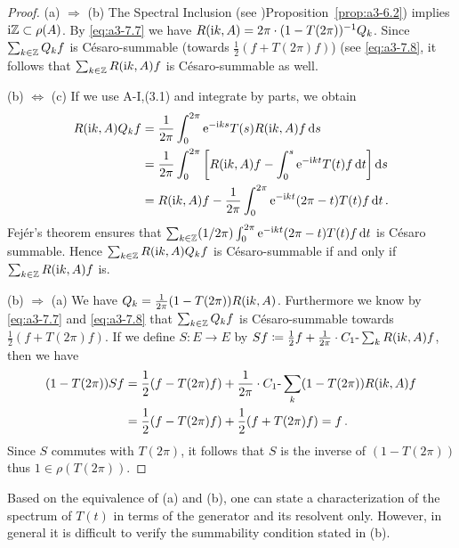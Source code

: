 \begin{proof}
(a) $\Rightarrow$ (b) The Spectral Inclusion (see )Proposition~\ref{prop:a3-6.2}) implies $\mathrm{i}\mathbb{Z} \subset \rho(A)$.
By \eqref{eq:a3-7.7} we have $R(\mathrm{i} k,A) = 2\pi\cdot(1-T(2\pi))^{-1}Q_{k}$.
Since $\sum_{k\in\mathbb{Z}} Q_{k}f$ is Césaro-summable (towards $\frac{1}{2}(f + T(2\pi)f)$) (see \eqref{eq:a3-7.8}, it follows that $\sum_{k\in\mathbb{Z}} R(\mathrm{i} k,A)f$ is Césaro-summable as well.

(b) $\Leftrightarrow$ (c) If we use A-I,(3.1) and integrate by parts, we obtain
\begin{align*}
R(\mathrm{i} k,A)Q_{k}f &= \frac{1}{2\pi}\int_{0}^{2\pi} \mathrm{e}^{-\mathrm{i} ks} T(s)R(\mathrm{i} k,A)f \mathop{}\!\mathrm{d}{s} \\
&= \frac{1}{2\pi}\int_{0}^{2\pi} \left[R(\mathrm{i} k,A)f - \int_{0}^{s} \mathrm{e}^{-\mathrm{i} kt} T(t)f \mathop{}\!\mathrm{d}{t}\right] \mathop{}\!\mathrm{d}{s} \\
&= R(\mathrm{i} k,A)f - \frac{1}{2\pi}\int_{0}^{2\pi} \mathrm{e}^{-\mathrm{i} kt} (2\pi-t) T(t)f \mathop{}\!\mathrm{d}{t}\,.
\end{align*}
Fejér's theorem ensures that $\sum_{k\in\mathbb{Z}} (1/2\pi)\int_{0}^{2\pi} \mathrm{e}^{-\mathrm{i} kt} (2\pi-t) T(t)f \mathop{}\!\mathrm{d}{t}$ is Césaro summable.
Hence $\sum_{k\in\mathbb{Z}} R(\mathrm{i} k,A)Q_{k}f$ is Césaro-summable if and only if $\sum_{k\in\mathbb{Z}} R(\mathrm{i} k,A)f$ is.

(b) $\Rightarrow$ (a) We have $Q_{k} = \frac{1}{2\pi}(1 - T(2\pi))R(\mathrm{i} k,A)$.
Furthermore we know by \eqref{eq:a3-7.7} and \eqref{eq:a3-7.8} that $\sum_{k\in\mathbb{Z}} Q_{k}f$ is Césaro-summable towards $\frac{1}{2}(f + T(2\pi)f)$.
If we define $S \colon E \to E$ by $Sf \coloneqq \frac{1}{2}f + \frac{1}{2\pi}\cdot C_{1}\text{-}\sum_k R(\mathrm{i} k,A)f$, then we have
\begin{align*}
(1 - T(2\pi))Sf &= \frac{1}{2}(f - T(2\pi)f) + \frac{1}{2\pi}\cdot C_{1}\text{-}\sum_k (1 - T(2\pi))R(\mathrm{i} k,A)f \\
&= \frac{1}{2}(f - T(2\pi)f) + \frac{1}{2}(f + T(2\pi)f) = f\,.
\end{align*}
Since $S$ commutes with $T(2\pi)$, it follows that $S$ is the inverse of $(1 - T(2\pi))$ thus $1 \in \rho(T(2\pi))$.
\end{proof}
Based on the equivalence of (a) and (b), one can state a characterization of the spectrum of $T(t)$ in terms of the generator and its resolvent only.
However, in general it is difficult to verify the summability condition stated in (b).

